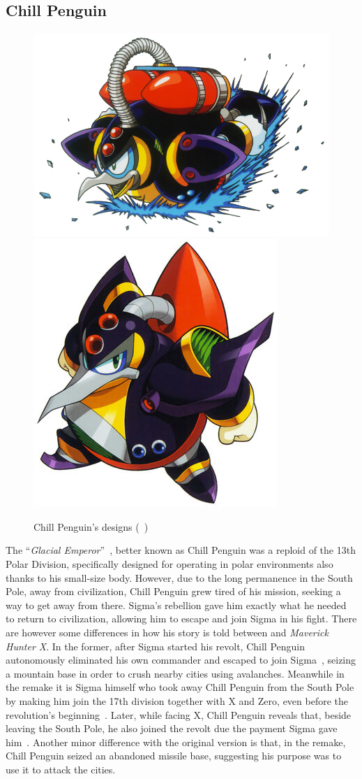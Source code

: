 \subsection{Chill Penguin}\label{boss:Chill_Penguin}
\begin{figure}[htp]
	\centering
	\includegraphics[width=0.5\linewidth]{figures/X1/Chill_penguin/Chill_Penguin.jpg}
	\includegraphics[width=0.4\linewidth]{figures/X1/Chill_penguin/MHXChillPenguin.jpg}
	\caption{Chill Penguin's designs (~\cite{book:MMX_Complete_art})}
\end{figure}

The ``\textit{Glacial Emperor}''~\cite{book:MMX_Complete_art}, better known as Chill Penguin was a reploid of the 13th Polar Division, specifically designed for operating in polar environments also thanks to his small-size body. However, due to the long permanence in the South Pole, away from civilization, Chill Penguin grew tired of his mission, seeking a way to get away from there. Sigma's rebellion gave him exactly what he needed to return to civilization, allowing him to escape and join Sigma in his fight. There are however some differences in how his story is told between \x and \textit{Maverick Hunter X}. In the former, after Sigma started his revolt, Chill Penguin autonomously eliminated his own commander and escaped to join Sigma~\cite{Xcoll1:Manual_X1}, seizing a mountain base in order to crush nearby cities using avalanches. Meanwhile in the remake it is Sigma himself who took away Chill Penguin from the South Pole by making him join the 17th division together with X and Zero, even before the revolution's beginning~\cite{MHX:manual}. Later, while facing X, Chill Penguin reveals that, beside leaving the South Pole, he also joined the revolt due the payment Sigma gave him~\cite{wiki:MMX_script}. Another minor difference with the original version is that, in the remake, Chill Penguin seized an abandoned missile base, suggesting his purpose was to use it to attack the cities. 

